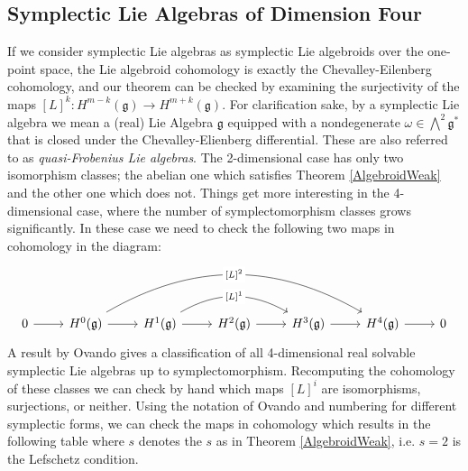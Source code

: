 \documentclass{amsart}
\newcommand{\ra}{\rightarrow}
\theoremstyle{definition}
\begin{document}
\subsection{Symplectic Lie Algebras of Dimension Four}
If we consider symplectic Lie algebras as symplectic Lie algebroids over the one-point space, the Lie algebroid cohomology is exactly the Chevalley-Eilenberg cohomology, and our theorem can be checked by examining the surjectivity of the maps $[L]^k:H^{m-k}(\mathfrak{g}) \ra H^{m+k}(\mathfrak{g})$. For clarification sake, by a symplectic Lie algebra we mean a (real) Lie Algebra $\mathfrak{g}$ equipped with a nondegenerate $\omega \in \bigwedge^2 \mathfrak{g}^*$ that is closed under the Chevalley-Elienberg differential. These are also referred to as \textit{quasi-Frobenius Lie algebras}. The 2-dimensional case has only two isomorphism classes; the abelian one which satisfies Theorem \ref{AlgebroidWeak} and the other one which does not. Things get more interesting in the 4-dimensional case, where the number of symplectomorphism classes grows significantly. In these case we need to check the following two maps in cohomology in the diagram:
\[\begin{tikzcd}[ampersand replacement=\&]
	0 \& {H^0 (\mathfrak{g})} \& {H^1 (\mathfrak{g})} \& {H^2( \mathfrak{g})} \& {H^3(\mathfrak{g})} \& {H^4( \mathfrak{g})} \& 0
	\arrow[from=1-1, to=1-2]
	\arrow[from=1-2, to=1-3]
	\arrow[from=1-3, to=1-4]
	\arrow[from=1-4, to=1-5]
	\arrow[from=1-5, to=1-6]
	\arrow[from=1-6, to=1-7]
	\arrow["{[L]^1}"{description}, bend left=30, from=1-3, to=1-5]
	\arrow["{[L]^2}"{description}, bend left=30, from=1-2, to=1-6]
\end{tikzcd}\]
 A result by Ovando \cite{ovando2004dimensional} gives a classification of all 4-dimensional real solvable symplectic Lie algebras up to symplectomorphism. Recomputing the cohomology of these classes we can check by hand which maps $[L]^i$ are isomorphisms, surjections, or neither. Using the notation of Ovando and numbering for different symplectic forms, we can check the maps in cohomology which results in the following table where $s$ denotes the $s$ as in Theorem \ref{AlgebroidWeak}, i.e. $s=2$ is the Lefschetz condition. 
\end{document}
